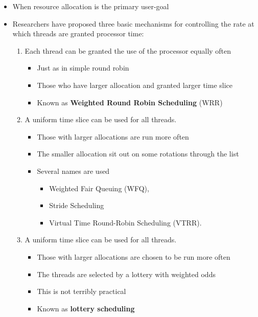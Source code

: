 \documentclass[11pt]{article}
\providecommand{\tightlist}{%
      \setlength{\itemsep}{0pt}\setlength{\parskip}{0pt}}
\begin{document}
\begin{itemize}
\tightlist
\item
  When resource allocation is the primary user-goal
\item
  Researchers have proposed three basic mechanisms for controlling the
  rate at which threads are granted processor time:

  \begin{enumerate}
  \def\labelenumi{\arabic{enumi}.}
  \tightlist
  \item
    Each thread can be granted the use of the processor equally often

    \begin{itemize}
    \tightlist
    \item
      Just as in simple round robin
    \item
      Those who have larger allocation and granted larger time slice
    \item
      Known as \textbf{Weighted Round Robin Scheduling} (WRR)
    \end{itemize}
  \item
    A uniform time slice can be used for all threads.

    \begin{itemize}
    \tightlist
    \item
      Those with larger allocations are run more often
    \item
      The smaller allocation sit out on some rotations through the list
    \item
      Several names are used

      \begin{itemize}
      \tightlist
      \item
        Weighted Fair Queuing (WFQ),
      \item
        Stride Scheduling
      \item
        Virtual Time Round-Robin Scheduling (VTRR).
      \end{itemize}
    \end{itemize}
  \item
    A uniform time slice can be used for all threads.

    \begin{itemize}
    \tightlist
    \item
      Those with larger allocations are chosen to be run more often
    \item
      The threads are selected by a lottery with weighted odds
    \item
      This is not terribly practical
    \item
      Known as \textbf{lottery scheduling}
    \end{itemize}
  \end{enumerate}
\end{itemize}
\end{document}
